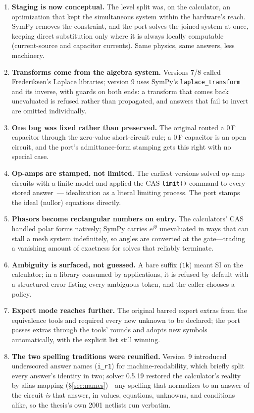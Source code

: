 \documentclass[11pt,oneside]{report}
\newcommand{\code}[1]{\texttt{#1}}
\begin{document}
\begin{enumerate}
\item \textbf{Staging is now conceptual.} The level split was, on the
  calculator, an optimization that kept the simultaneous system within
  the hardware's reach. SymPy removes the constraint, and the port
  solves the joined system at once, keeping direct substitution only
  where it is always locally computable (current-source and capacitor
  currents). Same physics, same answers, less machinery.
\item \textbf{Transforms come from the algebra system.} Versions 7/8
  called Frederiksen's Laplace libraries; version 9 uses SymPy's
  \code{laplace\_transform} and its inverse, with guards on both ends:
  a transform that comes back unevaluated is refused rather than
  propagated, and answers that fail to invert are omitted
  individually.
\item \textbf{One bug was fixed rather than preserved.} The original
  routed a 0\,F capacitor through the zero-value short-circuit rule; a
  0\,F capacitor is an open circuit, and the port's admittance-form
  stamping gets this right with no special case.
\item \textbf{Op-amps are stamped, not limited.} The earliest versions
  solved op-amp circuits with a finite model and applied the CAS
  \code{limit()} command to every stored answer~\cite{paper1999}---%
  idealization as a literal limiting process. The port stamps the
  ideal (nullor) equations directly.
\item \textbf{Phasors become rectangular numbers on entry.} The
  calculators' CAS handled polar forms natively; SymPy carries
  $e^{j\theta}$ unevaluated in ways that can stall a mesh system
  indefinitely, so angles are converted at the gate---trading a
  vanishing amount of exactness for solves that reliably terminate.
\item \textbf{Ambiguity is surfaced, not guessed.} A bare suffix
  (\code{1k}) meant SI on the calculator; in a library consumed by
  applications, it is refused by default with a structured error
  listing every ambiguous token, and the caller chooses a policy.
\item \textbf{Expert mode reaches further.} The original barred expert
  extras from the equivalence tools and required every new unknown to
  be declared; the port passes extras through the tools' rounds and
  adopts new symbols automatically, with the explicit list still
  winning.
\item \textbf{The two spelling traditions were reunified.} Version~9
  introduced underscored answer names (\code{i\_r1}) for
  machine-readability, which briefly split every answer's identity in
  two; solver 0.5.19 restored the calculator's reality by alias
  mapping (\S\ref{sec:names})---any spelling that normalizes to an
  answer of the circuit \emph{is} that answer, in values, equations,
  unknowns, and conditions alike, so the thesis's own 2001 netlists
  run verbatim.
\end{enumerate}
\end{document}

